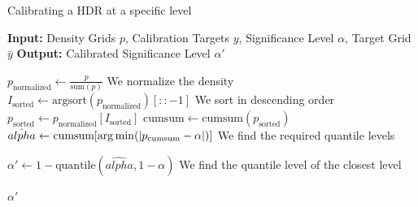 \begin{algorithm}
    \caption{Calibrating a HDR at a specific level}\label{alg:calibrate_hdr}
    \begin{algorithmic}
        \STATE\textbf{Input:} Density Grids $p$, Calibration Targets $y$, Significance Level $\alpha$, Target Grid $\bar{y}$
        \STATE\textbf{Output:} Calibrated Significance Level $\alpha'$

        \STATE$p_{\text{normalized}} \leftarrow \frac{p}{\text{sum}(p)}$ We normalize the density
        \STATE$I_{\text{sorted}} \leftarrow \text{argsort}(p_{\text{normalized}})[::-1]$ We sort in descending order
        \STATE$p_{\text{sorted}} \leftarrow p_{\text{normalized}}[I_{\text{sorted}}]$
        \STATE$\text{cumsum} \leftarrow \text{cumsum}(p_{\text{sorted}})$
        \STATE$\hat{alpha} \leftarrow \text{cumsum}[\operatorname*{arg\,min}(|p_{\text{cumsum}} - \alpha|)]$ We find the required quantile levels

        \STATE$\alpha' \leftarrow 1 - \text{quantile}(\hat{alpha}, 1 - \alpha)$ We find the quantile level of the closest level

        \RETURN$\alpha'$

    \end{algorithmic}
\end{algorithm}

